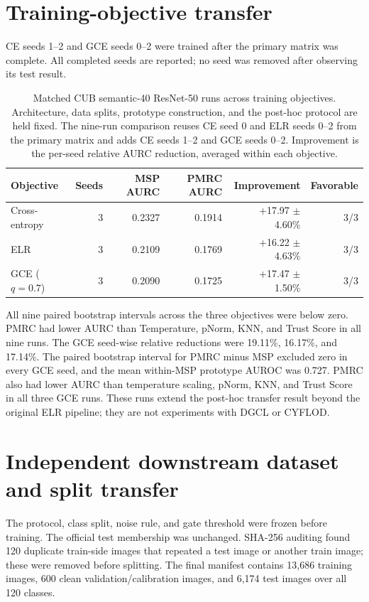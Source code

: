 \documentclass[11pt,a4paper]{article}
\begin{document}
\section{Training-objective transfer}

CE seeds 1--2 and GCE seeds 0--2 were trained after the primary matrix was
complete. All completed seeds are reported; no seed was removed after observing
its test result.

\begin{table}[H]
\centering
\caption{Matched CUB semantic-40 ResNet-50 runs across training objectives. Architecture, data splits, prototype construction, and the post-hoc protocol are held fixed. The nine-run comparison reuses CE seed 0 and ELR seeds 0--2 from the primary matrix and adds CE seeds 1--2 and GCE seeds 0--2. Improvement is the per-seed relative AURC reduction, averaged within each objective.}
\label{tab:training-objective-transfer}
\small
\begin{tabular}{@{}lrrrrr@{}}
\toprule
Objective & Seeds & MSP AURC & PMRC AURC & Improvement & Favorable \\ 
\midrule
Cross-entropy & 3 & 0.2327 & 0.1914 & +17.97 $\pm$ 4.60\% & 3/3 \\
ELR & 3 & 0.2109 & 0.1769 & +16.22 $\pm$ 4.63\% & 3/3 \\
GCE ($q=0.7$) & 3 & 0.2090 & 0.1725 & +17.47 $\pm$ 1.50\% & 3/3 \\
\bottomrule
\end{tabular}
\end{table}

All nine paired bootstrap intervals across the three objectives were below
zero. PMRC had lower AURC than Temperature, pNorm, KNN, and Trust Score in all
nine runs. The GCE seed-wise relative reductions were 19.11\%, 16.17\%, and
17.14\%.
The paired bootstrap interval for PMRC minus MSP excluded zero in every
GCE seed, and the mean within-MSP prototype AUROC was 0.727. PMRC also had
lower AURC than temperature scaling, pNorm, KNN, and Trust Score in all three
GCE runs. These runs extend the post-hoc transfer result beyond the original
ELR pipeline; they are not experiments with DGCL or CYFLOD.

\section{Independent downstream dataset and split transfer}

The protocol, class split, noise rule, and gate threshold were frozen before
training. The official test membership was unchanged. SHA-256 auditing found
120 duplicate train-side images that repeated a test image or another train
image; these were removed before splitting. The final manifest contains 13,686
training images, 600 clean validation/calibration images, and 6,174 test images
over all 120 classes.
\end{document}
